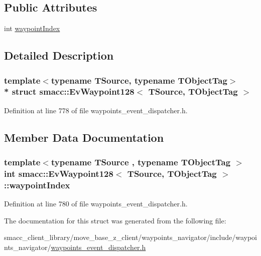 \subsection*{Public Attributes}
\begin{DoxyCompactItemize}
\item 
int \hyperlink{structsmacc_1_1EvWaypoint128_a197ce01942f18454f9b55f84622b7ca6}{waypoint\+Index}
\end{DoxyCompactItemize}


\subsection{Detailed Description}
\subsubsection*{template$<$typename T\+Source, typename T\+Object\+Tag$>$\\*
struct smacc\+::\+Ev\+Waypoint128$<$ T\+Source, T\+Object\+Tag $>$}



Definition at line 778 of file waypoints\+\_\+event\+\_\+dispatcher.\+h.



\subsection{Member Data Documentation}
\subsubsection[{\texorpdfstring{waypoint\+Index}{waypointIndex}}]{\setlength{\rightskip}{0pt plus 5cm}template$<$typename T\+Source , typename T\+Object\+Tag $>$ int {\bf smacc\+::\+Ev\+Waypoint128}$<$ T\+Source, T\+Object\+Tag $>$\+::waypoint\+Index}\hypertarget{structsmacc_1_1EvWaypoint128_a197ce01942f18454f9b55f84622b7ca6}{}\label{structsmacc_1_1EvWaypoint128_a197ce01942f18454f9b55f84622b7ca6}


Definition at line 780 of file waypoints\+\_\+event\+\_\+dispatcher.\+h.



The documentation for this struct was generated from the following file\+:\begin{DoxyCompactItemize}
\item 
smacc\+\_\+client\+\_\+library/move\+\_\+base\+\_\+z\+\_\+client/waypoints\+\_\+navigator/include/waypoints\+\_\+navigator/\hyperlink{waypoints__event__dispatcher_8h}{waypoints\+\_\+event\+\_\+dispatcher.\+h}\end{DoxyCompactItemize}
